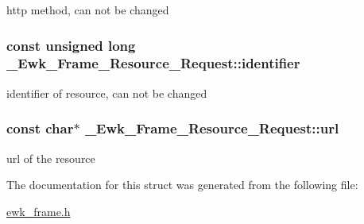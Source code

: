 http method, can not be changed \hypertarget{struct__Ewk__Frame__Resource__Request_a051c396f71ccbf8955aebc219c98375c}{
\subsubsection[{identifier}]{\setlength{\rightskip}{0pt plus 5cm}const unsigned long \+\_\+\+Ewk\+\_\+\+Frame\+\_\+\+Resource\+\_\+\+Request\+::identifier}}\label{struct__Ewk__Frame__Resource__Request_a051c396f71ccbf8955aebc219c98375c}
identifier of resource, can not be changed \hypertarget{struct__Ewk__Frame__Resource__Request_a88c8c0c0bc8dc3b052792a6d9d3cd074}{
\subsubsection[{url}]{\setlength{\rightskip}{0pt plus 5cm}const char$\ast$ \+\_\+\+Ewk\+\_\+\+Frame\+\_\+\+Resource\+\_\+\+Request\+::url}}\label{struct__Ewk__Frame__Resource__Request_a88c8c0c0bc8dc3b052792a6d9d3cd074}
url of the resource 

The documentation for this struct was generated from the following file\+:\begin{DoxyCompactItemize}
\item 
\hyperlink{ewk__frame_8h}{ewk\+\_\+frame.\+h}\end{DoxyCompactItemize}
